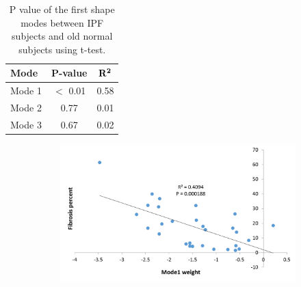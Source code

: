 \begin{table}[htbp]
\centering
\caption{P value of the first shape modes between IPF subjects and old normal subjects using t-test.}
\label{tab:ShapeVSFibrosis}
\begin{tabular}{|l | c | c |}
\hline
\bf{Mode} & \bf{P-value} & $\bf{R^2}$ \\
\hline
Mode 1 & $<$ 0.01 & 0.58 \\
\hline
Mode 2	& 0.77 & 0.01 \\
\hline
Mode 3	& 0.67 & 0.02 \\
\hline
\end{tabular}
\end{table}

\newpage

\begin{figure}[H] 
\centering
\begin{subfigure}{.65\linewidth}%
  \includegraphics[width=\linewidth,trim={{.0\wd0} {.0\wd0} {.0\wd0} {.0\wd0}},clip]{QuantitativeAnalysis/Image/Mode1AgainstFibrosis.png} %

\end{subfigure}
\end{figure}
